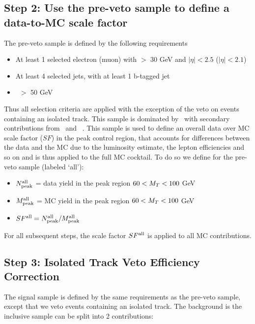 \subsection{Step 2: Use the pre-veto sample to define a data-to-MC scale factor}

The pre-veto sample is defined by the following requirements

\begin{itemize}
\item At least 1 selected electron (muon) with \pt $>$ 30 GeV and $|\eta|<2.5$ ($|\eta|<2.1$)
\item At least 4 selected jets, with at least 1 b-tagged jet
\item \MET\ $>$ 50 GeV
\end{itemize}

Thus all selection criteria are applied with the exception of the veto on events containing an isolated track. 
This sample is dominated by \ttlj\, with secondary contributions from \wjets\ and \ttll\ . 
This sample is used to define an overall data over MC scale factor ($SF$) in the peak control region, 
that accounts for differences between the data and the MC due to the luminosity estimate, the lepton 
efficiencies and so on and is thus applied to the full MC cocktail. 
To do so we define for the pre-veto sample (labeled `all'):

\begin{itemize}
\item $N_{\rm{peak}}^{\rm{all}}$ = data yield in the peak region $60<M_T<100$ GeV
\item $M_{\rm{peak}}^{\rm{all}}$ = MC yield in the peak region $60<M_T<100$ GeV
\item $SF^{\rm{all}} = N_{\rm{peak}}^{\rm{all}} / M_{\rm{peak}}^{\rm{all}}$
\end{itemize}

For all subsequent steps, the scale factor $SF^{\rm{all}}$ is applied to all MC contributions.

\subsection{Step 3: Isolated Track Veto Efficiency Correction}

The signal sample is defined by the same requirements as the pre-veto sample, except that we veto events containing
an isolated track. The background is the inclusive sample can be split into 2 contributions:

